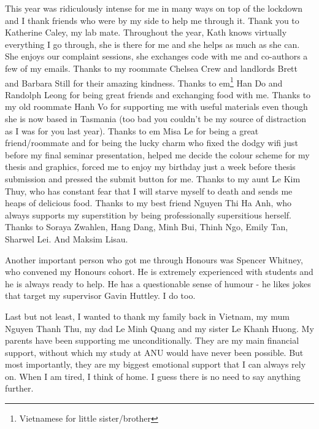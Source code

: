 This year was ridiculously intense for me in many ways on top of the lockdown and I thank friends who were by my side to help me through it. Thank you to Katherine Caley, my lab mate. Throughout the year, Kath knows virtually everything I go through, she is there for me and she helps as much as she can. She enjoys our complaint sessions, she exchanges code with me and co-authors a few of my emails. Thanks to my roommate Chelsea Crew and landlords Brett and Barbara Still for their amazing kindness. Thanks to em\footnote{Vietnamese for little sister/brother} Han Do and Randolph Leong for being great friends and exchanging food with me. Thanks to my old roommate Hanh Vo for supporting me with useful materials even though she is now based in Tasmania (too bad you couldn't be my source of distraction as I was for you last year). Thanks to em Misa Le for being a great friend/roommate and for being the lucky charm who fixed the dodgy wifi just before my final seminar presentation, helped me decide the colour scheme for my thesis and graphics, forced me to enjoy my birthday just a week before thesis submission and pressed the submit button for me. Thanks to my aunt Le Kim Thuy, who has constant fear that I will starve myself to death and sends me heaps of delicious food. Thanks to my best friend Nguyen Thi Ha Anh, who always supports my superstition by being professionally supersitious herself. Thanks to Soraya Zwahlen, Hang Dang, Minh Bui, Thinh Ngo, Emily Tan, Sharwel Lei. And Maksim Lisau.

Another important person who got me through Honours was Spencer Whitney, who convened my Honours cohort. He is extremely experienced with students and he is always ready to help. He has a questionable sense of humour - he likes jokes that target my supervisor Gavin Huttley. I do too. 

Last but not least, I wanted to thank my family back in Vietnam, my mum Nguyen Thanh Thu, my dad Le Minh Quang and my sister Le Khanh Huong. My parents have been supporting me unconditionally. They are my main financial support, without which my study at ANU would have never been possible. But most importantly, they are my biggest emotional support that I can always rely on. When I am tired, I think of home. I guess there is no need to say anything further. 